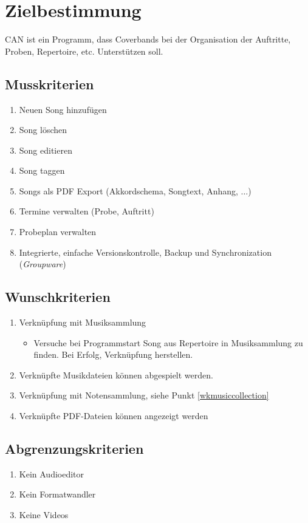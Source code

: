 \section{Zielbestimmung}

CAN ist ein Programm, dass Coverbands bei der Organisation der Auftritte, Proben, Repertoire, etc. Unterstützen soll.

\subsection{Musskriterien}

\begin{enumerate}[{/MK}1{/}]
\item Neuen Song hinzufügen
\item Song löschen
\item Song editieren
\item Song taggen
\item Songs als PDF Export (Akkordschema, Songtext, Anhang, $\dots$)
\item Termine verwalten (Probe, Auftritt)
\item Probeplan verwalten
\item Integrierte, einfache Versionskontrolle, Backup und Synchronization (\emph{Groupware})
\end{enumerate}

\subsection{Wunschkriterien}
\begin{enumerate}[{/WK}1{/}]
\item\label{wkmusiccollection} Verknüpfung mit Musiksammlung 
	\begin{itemize}
	\item Versuche bei Programmstart Song aus Repertoire in Musiksammlung zu finden. Bei Erfolg, Verknüpfung herstellen.
	\end{itemize}
\item Verknüpfte Musikdateien können abgespielt werden.
\item Verknüpfung mit Notensammlung, siehe Punkt \ref{wkmusiccollection}
\item Verknüpfte PDF-Dateien können angezeigt werden
\end{enumerate}

\subsection{Abgrenzungskriterien}
\begin{enumerate}[{/AK}1{/}]
\item Kein Audioeditor
\item Kein Formatwandler
\item Keine Videos
\end{enumerate}


